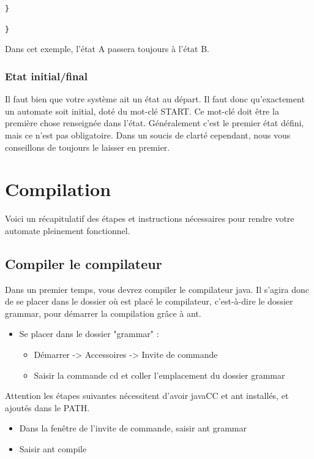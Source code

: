 \documentclass[a4paper,11pt]{article}
\begin{document}
\texttt{\quad \}}
	
\texttt{\}}

Dans cet exemple, l'état A passera toujours à l'état B.

\subsubsection{Etat initial/final}

Il faut bien que votre système ait un état au départ. Il faut donc qu'exactement un automate soit initial, doté du mot-clé START. Ce mot-clé doit être la première chose renseignée dans l'état.  
Généralement c'est le premier état défini, mais ce n'est pas obligatoire. Dans un soucis de clarté cependant, nous vous conseillons de toujours le laisser en premier.

\section{Compilation}

Voici un récapitulatif des étapes et instructions nécessaires pour rendre votre automate pleinement fonctionnel.

\subsection{Compiler le compilateur}
\onehalfspacing 

Dans un premier temps, vous devrez compiler le compilateur java. Il s'agira donc de se placer dans le dossier où est placé le compilateur, c'est-à-dire le dossier grammar, pour démarrer la compilation grâce à ant.

\begin{itemize}
	\item Se placer dans le dossier "grammar" :	
	\begin{itemize}
					\item Démarrer -> Accessoires -> Invite de commande
					\item Saisir la commande cd et coller l'emplacement du dossier grammar 
	\end{itemize}
\end{itemize}

Attention les étapes suivantes nécessitent d'avoir javaCC et ant installés, et ajoutés dans le PATH.

\begin{itemize}
	\item Dans la fenêtre de l'invite de commande, saisir ant grammar
	\item Saisir ant compile
\end{itemize}
		
\end{document}
